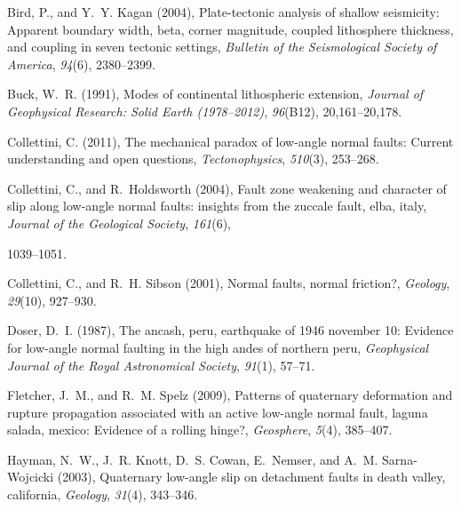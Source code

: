 \documentclass[twocolumn,grl]{AGUTeX}
\begin{document}
\begin{article}
\begin{thebibliography}{29}
Bird, P., and Y.~Y. Kagan (2004), Plate-tectonic analysis of shallow
  seismicity: Apparent boundary width, beta, corner magnitude, coupled
  lithosphere thickness, and coupling in seven tectonic settings,
  \textit{Bulletin of the Seismological Society of America}, \textit{94}(6),
  2380--2399.

Buck, W.~R. (1991), Modes of continental lithospheric extension,
  \textit{Journal of Geophysical Research: Solid Earth (1978--2012)},
  \textit{96}(B12), 20,161--20,178.

Collettini, C. (2011), The mechanical paradox of low-angle normal faults:
  Current understanding and open questions, \textit{Tectonophysics},
  \textit{510}(3), 253--268.

Collettini, C., and R.~Holdsworth (2004), Fault zone weakening and character of
  slip along low-angle normal faults: insights from the zuccale fault, elba,
  italy, \textit{Journal of the Geological Society}, \textit{161}(6),

  1039--1051.

Collettini, C., and R.~H. Sibson (2001), Normal faults, normal friction?,
  \textit{Geology}, \textit{29}(10), 927--930.

Doser, D.~I. (1987), The ancash, peru, earthquake of 1946 november 10: Evidence
  for low-angle normal faulting in the high andes of northern peru,
  \textit{Geophysical Journal of the Royal Astronomical Society},
  \textit{91}(1), 57--71.

Fletcher, J.~M., and R.~M. Spelz (2009), Patterns of quaternary deformation and
  rupture propagation associated with an active low-angle normal fault, laguna
  salada, mexico: Evidence of a rolling hinge?, \textit{Geosphere},
  \textit{5}(4), 385--407.

Hayman, N.~W., J.~R. Knott, D.~S. Cowan, E.~Nemser, and A.~M. Sarna-Wojcicki
  (2003), Quaternary low-angle slip on detachment faults in death valley,
  california, \textit{Geology}, \textit{31}(4), 343--346.


\end{thebibliography}
\end{article}
\end{document}
